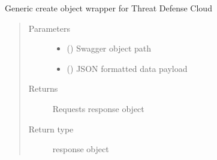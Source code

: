 \documentclass[letterpaper,10pt,english]{sphinxmanual}
\begin{document}
\begin{fulllineitems}
\begin{fulllineitems}
\begin{quote}
\begin{description}
\end{description}\end{quote}

\end{fulllineitems}


\begin{fulllineitems}
\label{\detokenize{b1tdc-class:bloxone.b1tdc.post}}
\sphinxAtStartPar
Generic create object wrapper for Threat Defense Cloud
\begin{quote}\begin{description}
\item[{Parameters}] \leavevmode\begin{itemize}
\item {} 
\sphinxAtStartPar
{} () \textendash{} Swagger object path

\item {} 
\sphinxAtStartPar
{} () \textendash{} JSON formatted data payload

\end{itemize}

\item[{Returns}] \leavevmode
\sphinxAtStartPar
Requests response object

\item[{Return type}] \leavevmode
\sphinxAtStartPar
response object

\end{description}\end{quote}

\end{fulllineitems}



\end{fulllineitems}
\end{document}
